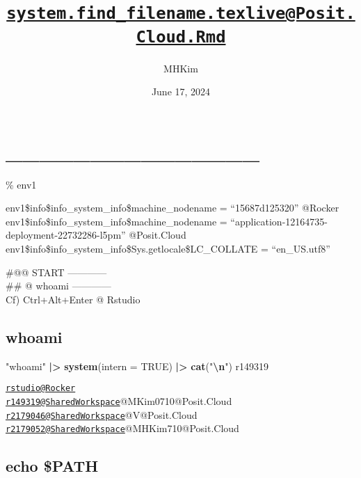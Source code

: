 \documentclass[
]{article}
\title{\href{mailto:system.find_filename.texlive@Posit.Cloud.Rmd}{\nolinkurl{system.find\_filename.texlive@Posit.Cloud.Rmd}}}
\author{MHKim}
\date{June 17, 2024}
\newenvironment{Shaded}{\begin{snugshade}}{\end{snugshade}}
\newcommand{\AttributeTok}[1]{\textcolor[rgb]{0.13,0.29,0.53}{#1}}
\newcommand{\ConstantTok}[1]{\textcolor[rgb]{0.56,0.35,0.01}{#1}}
\newcommand{\FunctionTok}[1]{\textcolor[rgb]{0.13,0.29,0.53}{\textbf{#1}}}
\newcommand{\NormalTok}[1]{#1}
\newcommand{\SpecialCharTok}[1]{\textcolor[rgb]{0.81,0.36,0.00}{\textbf{#1}}}
\newcommand{\StringTok}[1]{\textcolor[rgb]{0.31,0.60,0.02}{#1}}
\begin{document}
\maketitle

{
\setcounter{tocdepth}{6}
\tableofcontents
}
\hypertarget{section}{%
\section{\_\_\_\_\_\_\_\_\_\_\_\_\_\_\_}\label{section}}

\% env1~

env1\$info\$info\_system\_info\$machine\_nodename = ``15687d125320''
@Rocker\\
env1\$info\$info\_system\_info\$machine\_nodename =
``application-12164735-deployment-22732286-l5pm'' @Posit.Cloud\\
env1\$info\$info\_system\_info\$Sys.getlocale\$LC\_COLLATE =
``en\_US.utf8''

\#@@ START ------------\\
\#\# @ whoami ------------\\
Cf) Ctrl+Alt+Enter @ Rstudio

\hypertarget{whoami}{%
\subsection{whoami}\label{whoami}}

\begin{Shaded}
\begin{Highlighting}[]
\StringTok{"whoami"} \SpecialCharTok{|\textgreater{}}
    \FunctionTok{system}\NormalTok{(}\AttributeTok{intern =} \ConstantTok{TRUE}\NormalTok{) }\SpecialCharTok{|\textgreater{}}
    \FunctionTok{cat}\NormalTok{(}\StringTok{"}\SpecialCharTok{\textbackslash{}n}\StringTok{"}\NormalTok{)}
\NormalTok{r149319 }
\end{Highlighting}
\end{Shaded}

\href{mailto:rstudio@Rocker}{\nolinkurl{rstudio@Rocker}}\\
\href{mailto:r149319@SharedWorkspace}{\nolinkurl{r149319@SharedWorkspace}}@MKim0710@Posit.Cloud\\
\href{mailto:r2179046@SharedWorkspace}{\nolinkurl{r2179046@SharedWorkspace}}@V@Posit.Cloud\\
\href{mailto:r2179052@SharedWorkspace}{\nolinkurl{r2179052@SharedWorkspace}}@MHKim710@Posit.Cloud

\hypertarget{echo-path}{%
\subsection{echo \$PATH}\label{echo-path}}
\end{document}
